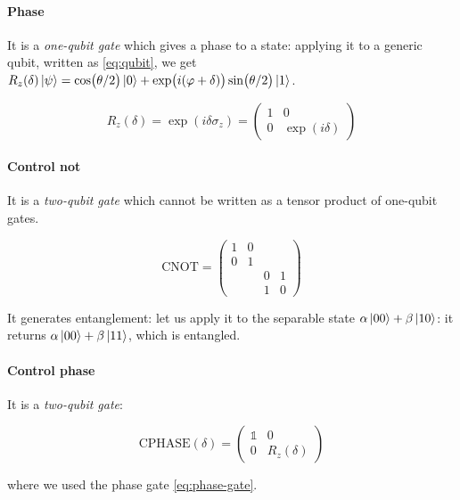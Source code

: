 \documentclass[main.tex]{subfiles}
\begin{document}
\paragraph{Phase}
It is a \emph{one-qubit gate} which  gives a phase to a state: applying it to a generic qubit, written as \eqref{eq:qubit}, we get \(R_z(\delta) \ket{\psi} =  \cos(\theta/2) \ket{0} + \exp(i(\varphi+\delta)) \sin(\theta/2)\ket{1}\).

\begin{equation} \label{eq:phase-gate}
    R_z (\delta) = \exp(i \delta \sigma_z) = \begin{pmatrix}
    1   & 0 \\
    0   & \exp(i \delta)
    \end{pmatrix}
\end{equation}

\paragraph{Control not} \label{par:cnot}
It is a \emph{two-qubit gate}  which cannot be written as a tensor product of one-qubit gates.

\begin{equation}
    \text{CNOT} = \begin{pmatrix}
    1   &  0 &   &  \\
      0 & 1  &   &  \\
       &   & 0  & 1 \\
       &   & 1  & 0
    \end{pmatrix}
\end{equation}

It generates entanglement: let us apply it to the separable state \(\alpha \ket{00} + \beta \ket{10} \): it returns \(\alpha \ket{00} + \beta \ket{11} \), which is entangled.

\paragraph{Control phase}

It is a \emph{two-qubit gate}:

\begin{equation}
    \text{CPHASE}(\delta) = \begin{pmatrix}
    \mathbb 1   & 0 \\
    0   & R_z(\delta)
    \end{pmatrix}
\end{equation}

where we used the phase gate \eqref{eq:phase-gate}.
\end{document}
